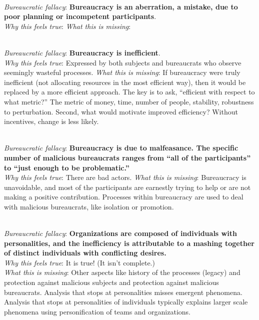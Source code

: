 \ \\

\textit{Bureaucratic fallacy}: \textbf{Bureaucracy is an aberration, a mistake, due to poor planning or incompetent participants}. \\
\textit{Why this feels true}: 
\textit{What this is missing}: 

\ \\

\textit{Bureaucratic fallacy}: \textbf{Bureaucracy is inefficient}. \\
\textit{Why this feels true}: Expressed by both subjects and bureaucrats who observe seemingly wasteful processes.
\textit{What this is missing}: If bureaucracy were truly inefficient (not allocating resources in the most efficient way), then it would be replaced by a more efficient approach. The key is to ask, ``efficient with respect to what metric?'' The metric of money, time, number of people, stability, robustness to perturbation.  Second, what would motivate improved efficiency? Without incentives, change is less likely. 

\ \\

\textit{Bureaucratic fallacy}: \textbf{Bureaucracy is due to malfeasance. The specific number of malicious bureaucrats ranges from ``all of the participants'' to ``just enough to be problematic.''} \\
\textit{Why this feels true}: There are bad actors. 
\textit{What this is missing}: Bureaucracy is unavoidable, and most of the participants are earnestly trying to help or are not making a positive contribution. Processes within bureaucracy are used to deal with malicious bureaucrats, like isolation or promotion. 

\ \\

\textit{Bureaucratic fallacy}: \textbf{Organizations are composed of individuals with personalities, and the inefficiency is attributable to a mashing together of distinct individuals with conflicting desires.} \\
\textit{Why this feels true}: It is true! (It isn't complete.) \\
\textit{What this is missing}: Other aspects like history of the processes (legacy) and protection against malicious subjects and protection against malicious bureaucrats. Analysis that stops at personalities misses emergent phenomena. Analysis that stops at personalities of individuals typically explains larger scale phenomena using personification of teams and organizations. 


